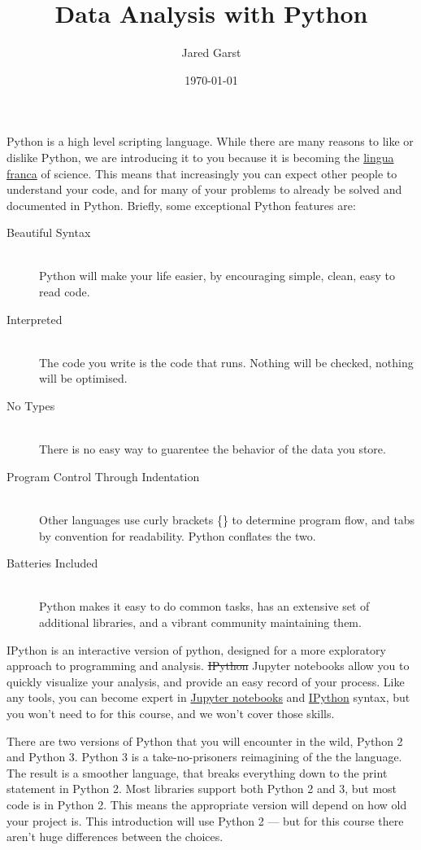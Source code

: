 \documentclass[justified, nobib]{tufte-handout}
\title{Data Analysis with Python}
\author{Jared Garst}
\date{\today} %
\newcommand{\ipythonTutorialLink}
  {http://ipython.readthedocs.org/en/stable/interactive/index.html}
\newcommand{\jupyterInfoLink}
  {http://jupyter-notebook.readthedocs.org/en/latest/notebook.html\#basic-workflow}
\newcommand{\linguaFrancaLink}{http://en.wikipedia.org/wiki/Lingua_franca}
\begin{document}
\maketitle
\bigskip


\noindent
Python is a high level scripting language. While there are many reasons to like
or dislike Python, we are introducing it to you because it is becoming the
\href{\linguaFrancaLink}{lingua franca} of
science. This means that increasingly you can expect other people to understand
your code, and for many of your problems to already be solved and documented in
Python. Briefly, some exceptional Python features are:

\begin{description}
\item[Beautiful Syntax] \hfill \\
  Python will make your life easier, by encouraging simple, clean, easy to read
  code.
\item[Interpreted] \hfill \\
  The code you write is the code that runs. Nothing will be checked, nothing
  will be optimised.
\item[No Types] \hfill \\
  There is no easy way to guarentee the behavior of the data you store.
\item[Program Control Through Indentation] \hfill \\
  Other languages use curly brackets \{\} to determine program flow, and tabs by
  convention for readability. Python conflates the two.
\item[Batteries Included] \hfill \\
  Python makes it easy to do common tasks, has an extensive set of additional
  libraries, and a vibrant community maintaining them.
\end{description}

\noindent
IPython is an interactive version of python, designed for a more exploratory
approach to programming and analysis.
\sout{IPython} Jupyter notebooks allow you to quickly visualize your analysis,
and provide an easy record of your process.
Like any tools, you can become expert in
\href{\jupyterInfoLink}{Jupyter notebooks} and
\href{\ipythonTutorialLink}{IPython} syntax, but you won't need to for this
course, and we won't cover those skills.

\smallskip
\noindent
There are two versions of Python that you will encounter in the wild, Python 2
and Python 3. Python 3 is a take-no-prisoners reimagining of the the
language.
The result is a smoother language, that breaks everything down to the print
statement in Python 2.
Most libraries support both Python 2 and 3, but most code is in Python 2.
This means the appropriate version will depend on how old your project is.
This introduction will use Python 2 --- but for this course there aren't huge
differences between the choices.
\end{document}
